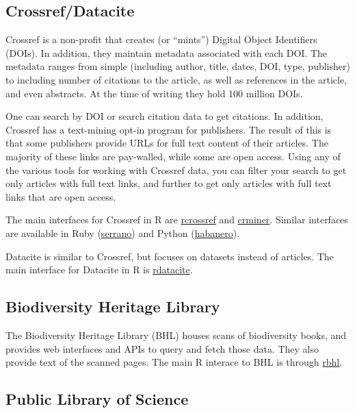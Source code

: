 \documentclass[author-year, review, 11pt]{components/elsarticle} %
\begin{document}
\hypertarget{crossrefdatacite}{%
\subsection{Crossref/Datacite}\label{crossrefdatacite}}

Crossref is a non-profit that creates (or ``mints'') Digital Object
Identifiers (DOIs). In addition, they maintain metadata associated with
each DOI. The metadata ranges from simple (including author, title,
dates, DOI, type, publisher) to including number of citations to the
article, as well as references in the article, and even abstracts. At
the time of writing they hold 100 million DOIs.

One can search by DOI or search citation data to get citations. In
addition, Crossref has a text-mining opt-in program for publishers. The
result of this is that some publishers provide URLs for full text
content of their articles. The majority of these links are pay-walled,
while some are open access. Using any of the various tools for working
with Crossref data, you can filter your search to get only articles with
full text links, and further to get only articles with full text links
that are open access.

The main interfaces for Crossref in R are
\href{https://github.com/ropensci/rcrossref}{rcrossref} and
\href{https://github.com/ropensci/crminer}{crminer}. Similar interfaces
are available in Ruby
(\href{https://github.com/sckott/serrano}{serrano}) and Python
(\href{https://github.com/sckott/habanero}{habanero}).

Datacite is similar to Crossref, but focuses on datasets instead of
articles. The main interface for Datacite in R is
\href{https://github.com/ropensci/rdatacite}{rdatacite}.

\hypertarget{biodiversity-heritage-library}{%
\subsection{Biodiversity Heritage
Library}\label{biodiversity-heritage-library}}

The Biodiversity Heritage Library (BHL) houses scans of biodiversity
books, and provides web interfaces and APIs to query and fetch those
data. They also provide text of the scanned pages. The main R interace
to BHL is through \href{https://github.com/ropensci/rbhl}{rbhl}.

\hypertarget{public-library-of-science}{%
\subsection{Public Library of Science}\label{public-library-of-science}}
\end{document}

